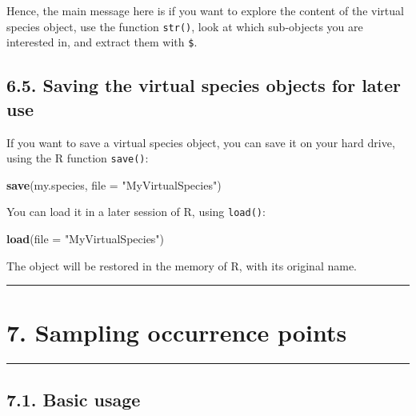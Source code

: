 \documentclass[]{article}
\newenvironment{Shaded}{\begin{snugshade}}{\end{snugshade}}
\newcommand{\KeywordTok}[1]{\textcolor[rgb]{0.13,0.29,0.53}{\textbf{#1}}}
\newcommand{\DataTypeTok}[1]{\textcolor[rgb]{0.13,0.29,0.53}{#1}}
\newcommand{\StringTok}[1]{\textcolor[rgb]{0.31,0.60,0.02}{#1}}
\newcommand{\NormalTok}[1]{#1}
\begin{document}
Hence, the main message here is if you want to explore the content of
the virtual species object, use the function \texttt{str()}, look at
which sub-objects you are interested in, and extract them with
\texttt{\$}.

\subsection{6.5. Saving the virtual species objects for later
use}\label{saving-the-virtual-species-objects-for-later-use}

If you want to save a virtual species object, you can save it on your
hard drive, using the R function \texttt{save()}:

\begin{Shaded}
\begin{Highlighting}[]
\KeywordTok{save}\NormalTok{(my.species, }\DataTypeTok{file =} \StringTok{"MyVirtualSpecies"}\NormalTok{)}
\end{Highlighting}
\end{Shaded}

You can load it in a later session of R, using \texttt{load()}:

\begin{Shaded}
\begin{Highlighting}[]
\KeywordTok{load}\NormalTok{(}\DataTypeTok{file =} \StringTok{"MyVirtualSpecies"}\NormalTok{)}
\end{Highlighting}
\end{Shaded}

The object will be restored in the memory of R, with its original name.

\begin{center}\rule{0.5\linewidth}{\linethickness}\end{center}

\section{7. Sampling occurrence
points}\label{sampling-occurrence-points}

\begin{center}\rule{0.5\linewidth}{\linethickness}\end{center}

\setcounter{section}{7} \setcounter{figure}{0}

\subsection{7.1. Basic usage}\label{basic-usage}
\end{document}

